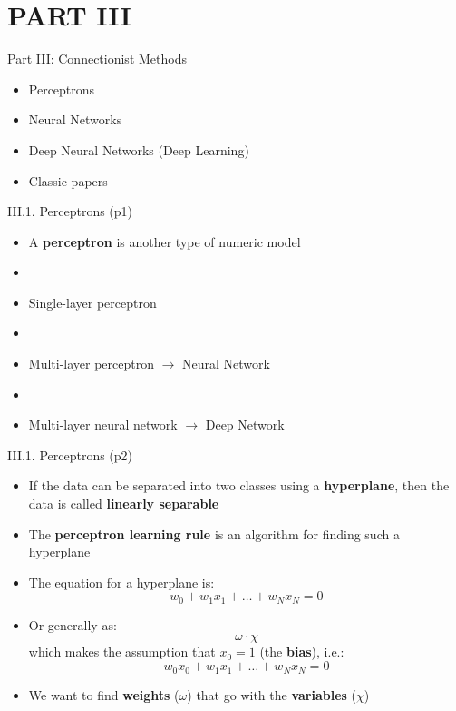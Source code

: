 \documentclass[handout]{beamer}
\newcommand{\strong}[1]{\textbf{\color{teal} #1}}
\newcommand{\stronger}[1]{\textbf{\color{purple} #1}}
\begin{document}
\section{PART III}
\begin{frame}{Part III: Connectionist Methods}
\begin{itemize}
\item[III.1] Perceptrons
\item[III.2] Neural Networks
\item[III.3] Deep Neural Networks (Deep Learning)
\item[III.4] Classic papers
\end{itemize}
\end{frame}
\begin{frame}{III.1. Perceptrons (p1)}
\begin{itemize}
\item A \stronger{perceptron} is another type of numeric model
\item[]
\item Single-layer perceptron
\item[]
\item Multi-layer perceptron $\rightarrow$ Neural Network
\item[]
\item Multi-layer neural network $\rightarrow$ Deep Network
\end{itemize}
\end{frame}
\begin{frame}{III.1. Perceptrons (p2)}
\begin{itemize}
\item If the data can be separated into two classes using a \strong{hyperplane}, then the data is called \strong{linearly separable}
\item The \stronger{perceptron learning rule} is an algorithm for finding such a hyperplane
\item The equation for a hyperplane is:
\[
w_0 + w_1 x_1 + \ldots + w_N x_N = 0
\]
\item Or generally as:
\[
	\omega \cdot \chi
\]
which makes the assumption that $x_0 = 1$ (the \strong{bias}), i.e.:
\[
w_0 x_0 + w_1 x_1 + \ldots + w_N x_N = 0
\]
\item We want to find \strong{weights} ($\omega$) that go with the \strong{variables} ($\chi$)
\end{itemize}
\end{frame}
\end{document}
